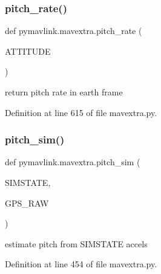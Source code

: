 \mbox{\label{namespacepymavlink_1_1mavextra_aee61cc54c7330f81c44bc7d477e18f3a}} 
\subsubsection{\texorpdfstring{pitch\_rate()}{pitch\_rate()}}
{\footnotesize\ttfamily def pymavlink.\+mavextra.\+pitch\+\_\+rate (\begin{DoxyParamCaption}\item[{}]{A\+T\+T\+I\+T\+U\+DE }\end{DoxyParamCaption})}

\begin{DoxyVerb}return pitch rate in earth frame\end{DoxyVerb}
 

Definition at line 615 of file mavextra.\+py.

\mbox{\label{namespacepymavlink_1_1mavextra_a600c961891b95309d492b08f957d1bf4}} 
\subsubsection{\texorpdfstring{pitch\_sim()}{pitch\_sim()}}
{\footnotesize\ttfamily def pymavlink.\+mavextra.\+pitch\+\_\+sim (\begin{DoxyParamCaption}\item[{}]{S\+I\+M\+S\+T\+A\+TE,  }\item[{}]{G\+P\+S\+\_\+\+R\+AW }\end{DoxyParamCaption})}

\begin{DoxyVerb}estimate pitch from SIMSTATE accels\end{DoxyVerb}
 

Definition at line 454 of file mavextra.\+py.

\mbox{\label{namespacepymavlink_1_1mavextra_a80093b7c26c5a448b247049fa10a203d}} 
